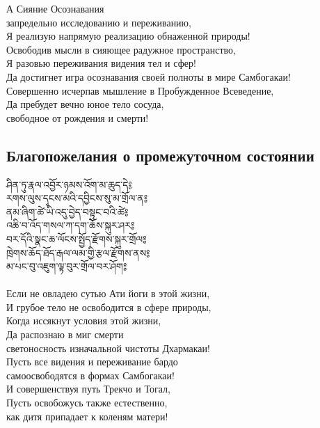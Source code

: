 А Сияние Осознавания \\ \indent запредельно исследованию и переживанию,\\
Я реализую напрямую реализацию обнаженной природы!\\
Освободив мысли в сияющее радужное пространство,\\
Я разовью переживания видения тел и сфер!\\
Да достигнет игра осознавания своей полноты в мире Самбогакаи!\\
Совершенно исчерпав мышление в Пробужденное Всеведение,\\
Да пребудет вечно юное тело сосуда, \\ \indent свободное от рождения и смерти!\\

\subsection{Благопожелания о промежуточном состоянии}
\ti
ཤིན་ཏུ་རྣལ་འབྱོར་ཉམས་འོག་མ་ཆུད་དེ༔\\
རགས་ལུས་དྭངས་མའི་དབྱིངས་སུ་མ་གྲོལ་ན༔\\
ནམ་ཞིག་ཚེ་ཡི་འདུ་བྱེད་བསྟུང་བའི་ཚེ༔\\
འཆི་བ་འོད་གསལ་ཀ་དག་ཆོས་སྐུར་ཤར༔\\
བར་དོའི་སྣང་ཆ་ལོངས་སྤྱོད་རྫོགས་སྐུར་གྲོལ༔\\
ཁྲེགས་ཆོད་ཐོད་རྒལ་ལམ་གྱི་རྩལ་རྫོགས་ནས༔\\
མ་པང་བུ་འཇུག་ལྟ་བུར་གྲོལ་བར་ཤོག༔\\
\\
\ru
Если не овладею сутью Ати йоги в этой жизни,\\
И грубое тело не освободится в сфере природы,\\
Когда иссякнут условия этой жизни,\\
Да распознаю в миг смерти\\
\indent светоносность изначальной чистоты Дхармакаи!\\
\newpage
Пусть все видения и переживание бардо \\
\indent самоосвободятся в формах Самбогакаи!\\
И совершенствуя путь Трекчо и Тогал,\\
Пусть освобожусь также естественно,\\
\indent как дитя припадает к коленям матери!

